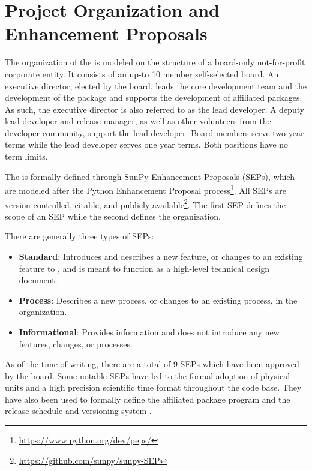 \section{Project Organization and Enhancement Proposals}
\label{sec:proj_org}

The organization of the \sunpyproj is modeled on the structure of a board-only not-for-profit corporate entity.
It consists of an up-to 10 member self-selected board.
An executive director, elected by the board, leads the core development team and the development of the \sunpypkg  package and supports the development of affiliated packages.
As such, the executive director is also referred to as the lead developer.
A deputy lead developer and release manager, as well as other volunteers from the developer community, support the lead developer.
Board members serve two year terms while the lead developer serves one year terms. Both positions have no term limits.

The \sunpyproj is formally defined through SunPy Enhancement Proposals (SEPs), which are modeled after the Python Enhancement Proposal process\footnote{\url{https://www.python.org/dev/peps/}}.
All SEPs are version-controlled, citable, and publicly available\footnote{\url{https://github.com/sunpy/sunpy-SEP}}.
The first SEP \citep[SEP-0001][]{sep-0001} defines the scope of an SEP \citep[similar to][]{ape-0001} while the second \citep[SEP-0002][]{sep-0002} defines the  \sunpyproj organization.

There are generally three types of SEPs:
\begin{itemize}
    \item \textbf{Standard}: Introduces and describes a new feature, or changes to an existing feature to \sunpypkg, and is meant to function as a high-level technical design document.
    \item \textbf{Process}: Describes a new process, or changes to an existing process, in the organization.
    \item \textbf{Informational}: Provides information and does not introduce any new features, changes, or processes.
\end{itemize}

As of the time of writing, there are a total of 9 SEPs which have been approved by the board.
Some notable SEPs have led to the formal adoption of physical units \citep[SEP-0003,][see \autoref{sec:units}]{sep-0003}  and a high precision scientific time format \citep[SEP-0008,][see \autoref{sec:units}]{sep-0008} throughout the code base.
They have also been used to formally define the affiliated package program \citep[SEP-0004,][see \autoref{sec:affil_package}]{sep-0004} and the release schedule and versioning system \citep[SEP-0009,][see \autoref{sec:release}]{sep-0009}.